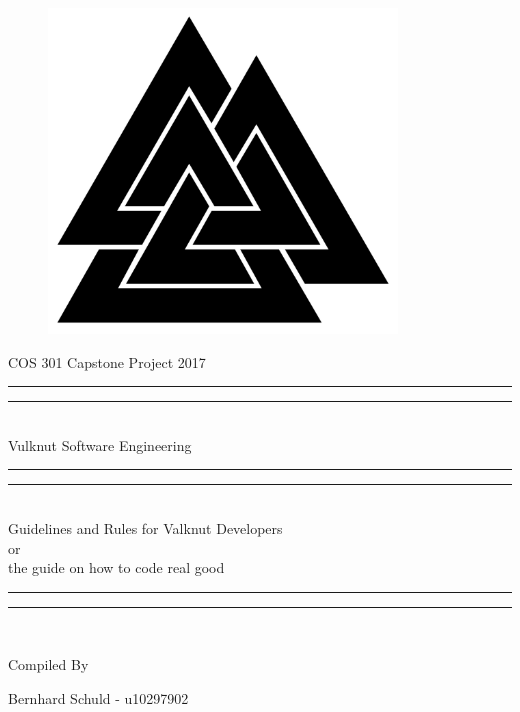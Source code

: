 \documentclass{article}
\begin{document}
	{\begingroup
		\begin{figure}[t]
			\centering
			\includegraphics[width=350px]{vseLogo.png}
		\end{figure}
		\centering

		{\Large COS 301 Capstone Project 2017}

		\vspace*{\baselineskip}

		\rule{\textwidth}{1.6pt}\vspace*{-\baselineskip}\vspace*{2pt}
		\rule{\textwidth}{0.4pt}\\[\baselineskip]

		{\Huge Vulknut Software Engineering } \\ [0.2\baselineskip]

		\rule{\textwidth}{0.4pt}\vspace*{-\baselineskip}\vspace*{2pt}
		\rule{\textwidth}{0.4pt}\\[\baselineskip]

		{\Large Guidelines and Rules for Valknut Developers } \\ [0.2\baselineskip]
    or \\
    the guide on how to code real good \\

		\rule{\textwidth}{0.4pt}\vspace*{-\baselineskip}\vspace{3.2pt}
		\rule{\textwidth}{1.6pt}\\[\baselineskip] %



		\bigskip

		Compiled By \\[\baselineskip]

		\bigskip

		{\Large Bernhard Schuld - u10297902 \\\par}

		\bigskip
		\bigskip

\endgroup}
\end{document}
